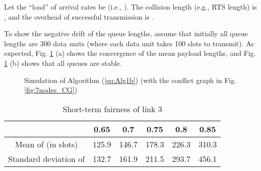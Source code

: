 \documentclass{IEEEtran}
\providecommand{\tabularnewline}{\\}
\begin{document}
Let the {}``load'' of arrival rates be  (i.e., ).
The collision length (e.g., RTS length) is , and the overhead
of successful transmission is . \begin{comment}
It can be verified that . 
\end{comment}
{}To show the negative drift of the queue lengths, assume that initially
all queue lengths are 300 data units (where each data unit takes 100
slots to transmit). As expected, Fig. \ref{fig:Alg1} (a) shows the
convergence of the mean payload lengths, and Fig. \ref{fig:Alg1}
(b) shows that all queues are stable. \begin{figure}
\begin{centering}
\par\end{centering}

\begin{centering}
\par\end{centering}

\caption{\label{fig:Alg1}Simulation of Algorithm (\ref{eq:Alg1b}) (with the
conflict graph in Fig. \ref{fig:7nodes_CG})}

\end{figure}
\begin{table}
\begin{centering}
\begin{tabular}{|c|c|c|c|c|c|}
\hline 
 & 0.65 & 0.7 & 0.75 & 0.8 & 0.85\tabularnewline
\hline
\hline 
Mean of  (in slots) & 125.9 & 146.7 & 178.3 & 226.3 & 310.3\tabularnewline
\hline 
Standard deviation of  & 132.7 & 161.9 & 211.5 & 293.7 & 456.1\tabularnewline
\hline
\end{tabular}
\par\end{centering}

\caption{\label{tab:st}Short-term fairness of link 3}

\end{table}
\end{document}
